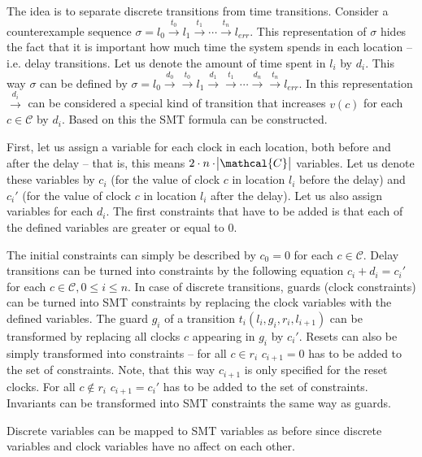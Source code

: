 The idea is to separate discrete transitions from time transitions. Consider a counterexample sequence $\sigma = l_0 \xrightarrow{t_0} l_1 \xrightarrow{t_1} \cdots \xrightarrow{t_n} l_{err}$.  This representation of $\sigma$ hides the fact that it is important how much time the system spends in each location -- i.e. delay transitions. Let us denote the amount of time spent in $l_i$ by $d_i$. This way $\sigma$ can be defined by $\sigma = l_0 \xrightarrow{d_0} \xrightarrow{t_0} l_1 \xrightarrow{d_1} \xrightarrow{t_1} \cdots \xrightarrow{d_n} \xrightarrow{t_n} l_{err}$. In this representation $\xrightarrow{d_i}$ can be considered a special kind of transition that increases $v(c)$ for each $c \in \mathcal{C}$ by $d_i$. Based on this the SMT formula can be constructed.

First, let us assign a variable for each clock in each location, both before and after the delay -- that is, this means $2\cdot n \cdot \abs{\mathcal{C}}$ variables. Let us denote these variables by $c_i$ (for the value of clock $c$ in location $l_i$ before the delay) and $c_i'$ (for the value of clock $c$ in location $l_i$ after the delay). Let us also assign variables for each $d_i$. The first constraints that have to be added is that each of the defined variables are greater or equal to 0.

The initial constraints can simply be described by $c_0 =0$ for each $c \in \mathcal{C}$. Delay transitions can be turned into constraints by the following equation $c_i+d_i=c_i'$ for each $c \in \mathcal{C}, 0 \leq i \leq n$. In case of discrete transitions, guards (clock constraints) can be turned into SMT constraints by replacing the clock variables with the defined variables. The guard $g_i$ of a transition $t_i(l_i,g_i,r_i,l_{i+1})$ can be transformed by replacing all clocks $c$ appearing in $g_i$ by $c_i'$. Resets can also be simply transformed into constraints -- for all $c \in r_i$ $c_{i+1}=0$ has to be added to the set of constraints. Note, that this way $c_{i+1}$ is only specified for the reset clocks. For all $c \not\in r_i$ $c_{i+1}=c_i'$ has to be added to the set of constraints. Invariants can be transformed into SMT constraints the same way as guards.

Discrete variables can be mapped to SMT variables as before since discrete variables and clock variables have no affect on each other.


